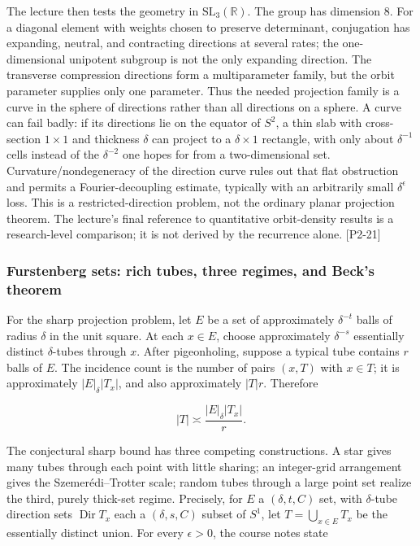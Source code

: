 The lecture then tests the geometry in \(\mathrm{SL}_3(\mathbb R)\). The group has dimension \(8\). For a diagonal element with weights chosen to preserve determinant, conjugation has expanding, neutral, and contracting directions at several rates; the one-dimensional unipotent subgroup is not the only expanding direction. The transverse compression directions form a multiparameter family, but the orbit parameter supplies only one parameter. Thus the needed projection family is a curve in the sphere of directions rather than all directions on a sphere. A curve can fail badly: if its directions lie on the equator of \(S^2\), a thin slab with cross-section \(1\times1\) and thickness \(\delta\) can project to a \(\delta\times1\) rectangle, with only about \(\delta^{-1}\) cells instead of the \(\delta^{-2}\) one hopes for from a two-dimensional set. Curvature/nondegeneracy of the direction curve rules out that flat obstruction and permits a Fourier-decoupling estimate, typically with an arbitrarily small \(\delta^\epsilon\) loss. This is a restricted-direction problem, not the ordinary planar projection theorem. The lecture's final reference to quantitative orbit-density results is a research-level comparison; it is not derived by the recurrence alone. {[}P2-21{]}

\subsubsection{Furstenberg sets: rich tubes, three regimes, and Beck's theorem}\label{04-visual-computing-ii-ch033-furstenberg-sets-rich-tubes-three-regimes-and-becks-theorem}

For the sharp projection problem, let \(E\) be a set of approximately \(\delta^{-t}\) balls of radius \(\delta\) in the unit square. At each \(x\in E\), choose approximately \(\delta^{-s}\) essentially distinct \(\delta\)-tubes through \(x\). After pigeonholing, suppose a typical tube contains \(r\) balls of \(E\). The incidence count is the number of pairs \((x,T)\) with \(x\in T\); it is approximately \(|E|_\delta |T_x|\), and also approximately \(|T|r\). Therefore

\[|T|\asymp \frac{|E|_\delta |T_x|}{r}.\]

The conjectural sharp bound has three competing constructions. A star gives many tubes through each point with little sharing; an integer-grid arrangement gives the Szemerédi--Trotter scale; random tubes through a large point set realize the third, purely thick-set regime. Precisely, for \(E\) a \((\delta,t,C)\) set, with \(\delta\)-tube direction sets \(\operatorname{Dir}T_x\) each a \((\delta,s,C)\) subset of \(S^1\), let \(T=\bigcup_{x\in E}T_x\) be the essentially distinct union. For every \(\epsilon>0\), the course notes state

